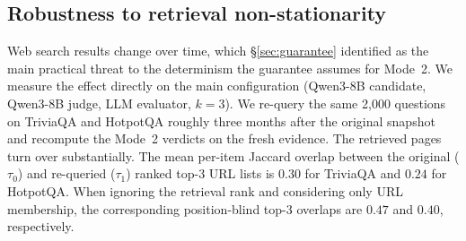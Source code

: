 \begin{table}[!ht]
\centering
\caption{Coverage at $\alpha\!=\!0.20$: Mode~1 Only vs.\ Joint (two-threshold routing with retrieval).}
\label{tab:mode1_vs_joint}
\end{table}
\subsection{Robustness to retrieval non-stationarity}
\label{sec:drift}
Web search results change over time, which \S\ref{sec:guarantee} identified as the main practical threat to the determinism the guarantee assumes for Mode~2. We measure the effect directly on the main configuration (Qwen3-8B candidate, Qwen3-8B judge, LLM evaluator, $k\!=\!3$). We re-query the same 2{,}000 questions on TriviaQA and HotpotQA roughly three months after the original snapshot and recompute the Mode~2 verdicts on the fresh evidence. The retrieved pages turn over substantially. The mean per-item Jaccard overlap between the original ($\tau_0$) and re-queried ($\tau_1$) ranked top-$3$ URL lists is $0.30$ for TriviaQA and $0.24$ for HotpotQA. When ignoring the retrieval rank and considering only URL membership, the corresponding position-blind top-$3$ overlaps are $0.47$ and $0.40$, respectively.

